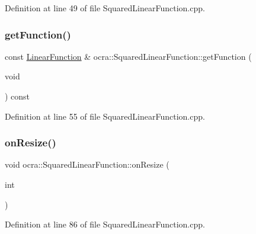 Definition at line 49 of file Squared\+Linear\+Function.\+cpp.

\hypertarget{classocra_1_1SquaredLinearFunction_a3ab1215a6687d72cc56727ccb35ccb3a}{}\label{classocra_1_1SquaredLinearFunction_a3ab1215a6687d72cc56727ccb35ccb3a} 
\subsubsection{\texorpdfstring{get\+Function()}{getFunction()}\hspace{0.1cm}{\footnotesize\ttfamily [2/2]}}
{\footnotesize\ttfamily const \hyperlink{classocra_1_1LinearFunction}{Linear\+Function} \& ocra\+::\+Squared\+Linear\+Function\+::get\+Function (\begin{DoxyParamCaption}\item[{void}]{ }\end{DoxyParamCaption}) const}



Definition at line 55 of file Squared\+Linear\+Function.\+cpp.

\hypertarget{classocra_1_1SquaredLinearFunction_a9e6a87607548f1f1eac56eecfc1b05b5}{}\label{classocra_1_1SquaredLinearFunction_a9e6a87607548f1f1eac56eecfc1b05b5} 
\subsubsection{\texorpdfstring{on\+Resize()}{onResize()}}
{\footnotesize\ttfamily void ocra\+::\+Squared\+Linear\+Function\+::on\+Resize (\begin{DoxyParamCaption}\item[{int}]{ }\end{DoxyParamCaption})\hspace{0.3cm}{\ttfamily [protected]}}



Definition at line 86 of file Squared\+Linear\+Function.\+cpp.

\hypertarget{classocra_1_1SquaredLinearFunction_a194606ccd86f17dbc73a6c3bdf2455c9}{}\label{classocra_1_1SquaredLinearFunction_a194606ccd86f17dbc73a6c3bdf2455c9} 
